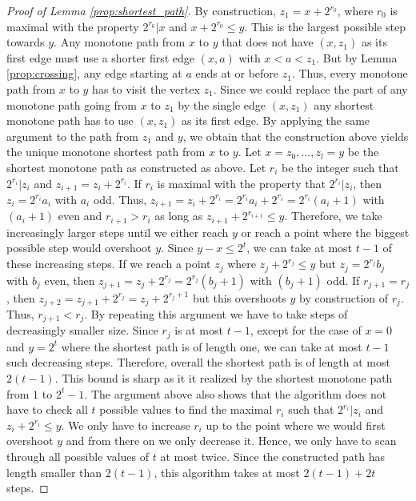 %
\begin{proof}[Proof of Lemma \ref{prop:shortest_path}]
By construction, $z_1=x+2^{r_0}$, where $r_0$ is maximal with the property $2^{r_0}\vert x$ and $x+2^{r_0}\leq y$. This is the largest possible step towards $y$. Any monotone path from $x$ to $y$ that does not have $(x,z_1)$ as its first edge must use a shorter first edge $(x,a)$ with $x<a<z_1$. But by Lemma \ref{prop:crossing}, any edge starting at $a$ ends at or before $z_1$. Thus, every monotone path from $x$ to $y$ has to visit the vertex $z_1$. Since we could replace the part of any monotone path going from $x$ to $z_1$ by the single edge $(x,z_1)$ any shortest monotone path has to use $(x,z_1)$ as its first edge. By applying the same argument to the path from $z_1$ and $y$, we obtain that the construction above yields the unique monotone shortest path from $x$ to $y$.   
%
Let $x=z_0,\ldots,z_l=y$ be the shortest monotone path as constructed as above. Let $r_i$ be the integer such that $2^{r_i}\vert z_i$ and $z_{i+1}=z_i+2^{r_i}$. If $r_i$ is maximal with the property that $2^{r_i}\vert z_i$, then $z_i=2^{r_i}a_i$ with $a_i$ odd. Thus, $z_{i+1}=z_i+2^{r_i}=2^{r_i}a_i+2^{r_i}=2^{r_i}(a_i+1)$ with $(a_i+1)$ even and $r_{i+1}>r_i$ as long as $z_{i+1}+2^{r_{i+1}}\leq y$. Therefore, we take increasingly larger steps until we either reach $y$ or reach a point where the biggest possible step would overshoot $y$. Since $y-x\leq 2^t$, we can take at most $t-1$ of these increasing steps. If we reach a point $z_j$ where $z_j+2^{r_{j}}\leq y$ but $z_j=2^{r_j}b_j$ with $b_j$ even, then $z_{j+1}=z_j+2^{r_j}=2^{r_j}(b_j+1)$ with $(b_j+1)$ odd. If $r_{j+1}=r_j$, then $z_{j+2}=z_{j+1}+2^{r_j}=z_j+2^{r_j+1}$ but this overshoots $y$ by construction of $r_j$. Thus, $r_{j+1}<r_{j}$. By repeating this argument we have to take steps of decreasingly smaller size. Since $r_j$ is at most $t-1$, except for the case of $x=0$ and $y=2^t$ where the shortest path is of length one, we can take at most $t-1$ such decreasing steps. Therefore, overall the shortest path is of length at most $2(t-1)$. This bound is sharp as it it realized by the shortest monotone path from $1$ to $2^{t}-1$. 
%
The argument above also shows that the algorithm does not have to check all $t$ possible values to find the maximal $r_i$ such that $2^{r_i}\vert z_i$ and $z_i+2^{r_i}\leq y$. We only have to increase $r_i$ up to the point where we would first overshoot $y$ and from there on we only decrease it. Hence, we only have to scan through all possible values of $t$ at most twice. Since the constructed path has length smaller than $2(t-1)$, this algorithm takes at most $2(t-1)+2t$ steps.   
\end{proof}
%
%
